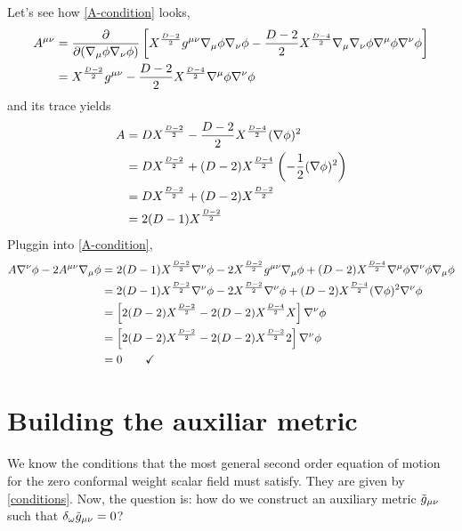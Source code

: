 \begin{ej}
Let's see how \eqref{A-condition} looks,
\begin{align}
  A^{\mu\nu }&=\pdv{(\nabla_\mu\phi\nabla_\nu\phi)}\left[X^{\frac{D-2}{2}}g^{\mu\nu }\nabla_\mu\phi \nabla_\nu\phi  -\frac{D-2}{2}X^{\frac{D-4}{2}}\nabla_\mu \nabla_\nu \phi\nabla^\mu \phi\nabla^\nu \phi \right]\\
  &=X^{\frac{D-2}{2}}g^{\mu\nu }-\frac{D-2}{2}X^{\frac{D-4}{2}}\nabla^\mu \phi \nabla^\nu\phi 
\end{align}
and its trace yields
\begin{align}
  A&=DX^{\frac{D-2}{2}}-\frac{D-2}{2}X^{\frac{D-4}{2}}(\nabla\phi )^2\\
  &=DX^{\frac{D-2}{2}}+(D-2)X^{\frac{D-4}{2}}\left(-\frac{1}{2}(\nabla\phi )^2\right)\\
  &=DX^{\frac{D-2}{2}}+(D-2)X^{\frac{D-2}{2}}\\
  &=2(D-1)X^{\frac{D-2}{2}}
\end{align}
Pluggin into \eqref{A-condition},
\begin{align*}
  A\nabla^\nu \phi-2A^{\mu\nu }\nabla_\mu \phi&=2(D-1)X^{\frac{D-2}{2}}\nabla^\nu\phi -2X^{\frac{D-2}{2}}g^{\mu\nu }\nabla_\mu \phi +(D-2)X^{\frac{D-4}{2}}\nabla^\mu\phi \nabla^\nu\phi \nabla_\mu\phi \\
  &=2(D-1)X^{\frac{D-2}{2}}\nabla^\nu\phi-2X^{\frac{D-2}{2}}\nabla^\nu\phi +(D-2)X^{\frac{D-4}{2}}(\nabla\phi )^2\nabla^\nu\phi \\
  &=\left[2(D-2)X^{\frac{D-2}{2}}-2(D-2)X^{\frac{D-4}{2}}X\right]\nabla^\nu\phi \\
  &=\left[2(D-2)X^{\frac{D-2}{2}}-2(D-2)X^{\frac{D-2}{2}}2\right]\nabla^\nu\phi \\
  &=0\qquad \checkmark
\end{align*}
\end{ej}



\section{Building the auxiliar metric}
We know the conditions that the most general second order equation of motion for the zero conformal weight scalar field must satisfy. They are given by \eqref{conditions}. Now, the question is: how do we construct an auxiliary metric $\tilde{g}_{\mu\nu }$ such that  $\delta_\omega \tilde{g}_{\mu\nu }=0$?

